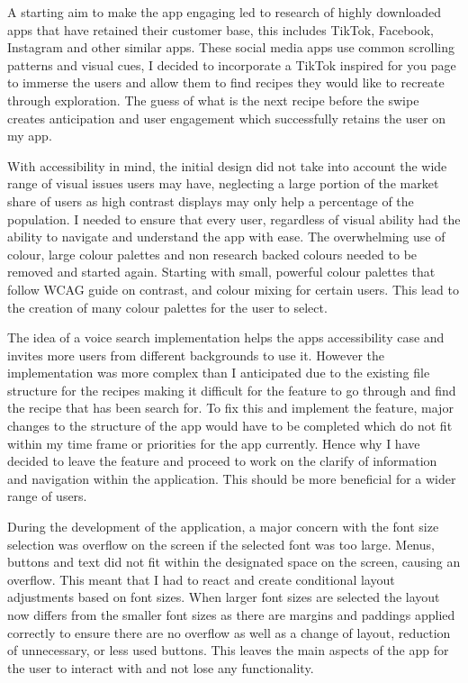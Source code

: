 \documentclass[]{project_final}
\begin{document}
A starting aim to make the app engaging led to research of highly downloaded apps that have retained their customer base, this includes TikTok, Facebook, Instagram and other similar apps. These social media apps use common scrolling patterns and visual cues, I decided to incorporate a TikTok inspired for you page to immerse the users and allow them to find recipes they would like to recreate through exploration. The guess of what is the next recipe before the swipe creates anticipation and user engagement which successfully retains the user on my app.


With accessibility in mind, the initial design did not take into account the wide range of visual issues users may have, neglecting a large portion of the market share of users as high contrast displays may only help a percentage of the population. I needed to ensure that every user, regardless of visual ability had the ability to navigate and understand the app with ease. The overwhelming use of colour, large colour palettes and non research backed colours needed to be removed and started again. Starting with small, powerful colour palettes that follow WCAG guide on contrast, and colour mixing for certain users. This lead to the creation of many colour palettes for the user to select.

The idea of a voice search implementation helps the apps accessibility case and invites more users from different backgrounds to use it. However the implementation was more complex than I anticipated due to the existing file structure for the recipes making it difficult for the feature to go through and find the recipe that has been search for. To fix this and implement the feature, major changes to the structure of the app would have to be completed which do not fit within my time frame or priorities for the app currently. Hence why I have decided to leave the feature and proceed to work on the clarify of information and navigation within the application. This should be more beneficial for a wider range of users.

During the development of the application, a major concern with the font size selection was overflow on the screen if the selected font was too large. Menus, buttons and text did not fit within the designated space on the screen, causing an overflow. This meant that I had to react and create conditional layout adjustments based on font sizes.
When larger font sizes are selected the layout now differs from the smaller font sizes as there are margins and paddings applied correctly to ensure there are no overflow as well as a change of layout, reduction of unnecessary, or less used buttons. This leaves the main aspects of the app for the user to interact with and not lose any functionality.
\end{document}
